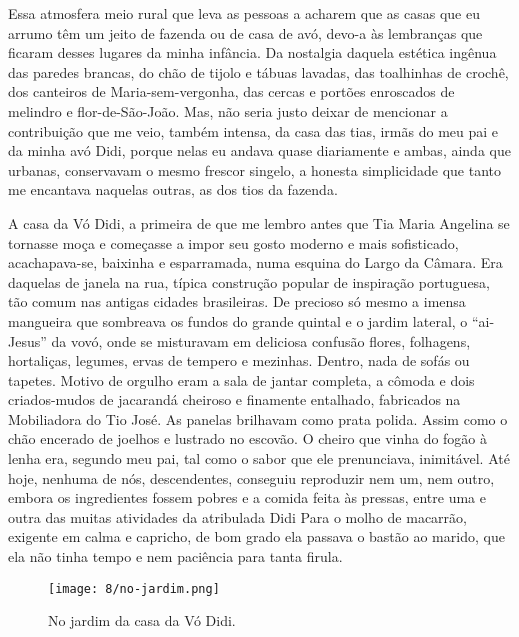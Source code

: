 Essa atmosfera meio rural que leva as pessoas a acharem que as casas que eu arrumo têm um jeito de fazenda ou de casa de avó, devo-a às lembranças que ficaram desses lugares da minha infância.
Da nostalgia daquela estética ingênua das paredes brancas, do chão de tijolo e tábuas lavadas, das toalhinhas de crochê, dos canteiros de Maria-sem-vergonha, das cercas e portões enroscados de melindro e flor-de-São-João.
Mas, não seria justo deixar de mencionar a contribuição que me veio, também intensa, da casa das tias, irmãs do meu pai e da minha avó Didi, porque nelas eu andava quase diariamente e ambas, ainda que urbanas, conservavam o mesmo frescor singelo, a honesta simplicidade que tanto me encantava naquelas outras, as dos tios da fazenda.


A casa da Vó Didi, a primeira de que me lembro antes que Tia Maria Angelina se tornasse moça e começasse a impor seu gosto moderno e mais sofisticado, acachapava-se, baixinha e esparramada, numa esquina do Largo da Câmara.
Era daquelas de janela na rua, típica construção popular de inspiração portuguesa, tão comum nas antigas cidades brasileiras.
De precioso só mesmo a imensa mangueira que sombreava os fundos do grande quintal e o jardim lateral, o “ai-Jesus” da vovó, onde se misturavam em deliciosa confusão flores, folhagens, hortaliças, legumes, ervas de tempero e mezinhas.
Dentro, nada de sofás ou tapetes.
Motivo de orgulho eram a sala de jantar completa, a cômoda e dois criados-mudos de jacarandá cheiroso e finamente entalhado, fabricados na Mobiliadora do Tio José.
As panelas brilhavam como prata polida.
Assim como o chão encerado de joelhos e lustrado no escovão.
O cheiro que vinha do fogão à lenha era, segundo meu pai, tal como o sabor que ele prenunciava, inimitável.
Até hoje, nenhuma de nós, descendentes, conseguiu reproduzir nem um, nem outro, embora os ingredientes fossem pobres e a comida feita às pressas, entre uma e outra das muitas atividades da atribulada Didi
Para o molho de macarrão, exigente em calma e capricho, de bom grado ela passava o bastão ao marido, que ela não tinha tempo e nem paciência para tanta firula.

\begin{figure}[H]
\centering
\texttt{[image: 8/no-jardim.png]}
\caption{No jardim da casa da Vó Didi.}
\end{figure}

